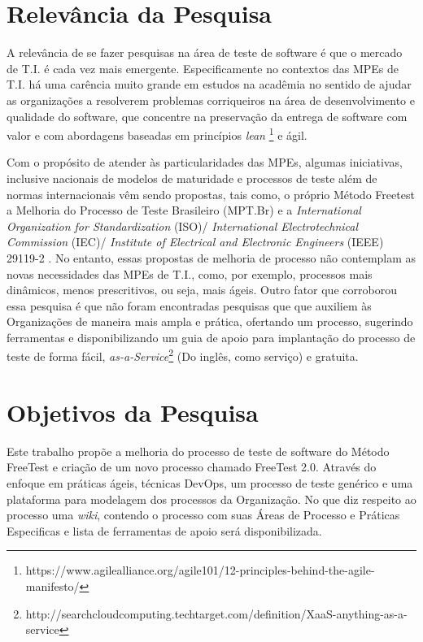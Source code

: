 \section{Relevância da Pesquisa}

A relevância de se fazer pesquisas na área de teste de software é que o mercado de T.I. é cada vez mais emergente. Especificamente no contextos das MPEs de T.I. há uma carência muito grande em estudos na acadêmia no sentido de ajudar as organizações a resolverem problemas corriqueiros na área de desenvolvimento e qualidade do software, que concentre na preservação da entrega de software com valor e com abordagens baseadas em princípios \textit{lean} \footnote{https://www.agilealliance.org/agile101/12-principles-behind-the-agile-manifesto/} e ágil.

Com o propósito de atender às particularidades das MPEs, algumas iniciativas, inclusive nacionais de modelos de maturidade e processos de teste além de normas internacionais vêm sendo propostas, tais como, o próprio Método Freetest \cite{Camilo-junior2012} a Melhoria do Processo de Teste Brasileiro (MPT.Br) \cite{GuiaMPTbr} e a \textit{International Organization for Standardization} (ISO)/ \textit{International Electrotechnical Commission} (IEC)/ \textit{Institute of Electrical and Electronic Engineers} (IEEE) 29119-2 \cite{Standard2013}. No entanto, essas propostas de melhoria de processo não contemplam as novas necessidades das MPEs de T.I., como, por exemplo, processos mais dinâmicos, menos prescritivos, ou seja, mais ágeis. Outro fator que corroborou essa pesquisa é que não foram encontradas pesquisas que que auxiliem às Organizações de maneira mais ampla e prática, ofertando um processo, sugerindo ferramentas e disponibilizando um guia de apoio para implantação do processo de teste de forma fácil, \textit{as-a-Service}\footnote{http://searchcloudcomputing.techtarget.com/definition/XaaS-anything-as-a-service} (Do inglês, como serviço) e gratuita.

\section{Objetivos da Pesquisa}
\label{cap:objetivos}

Este trabalho propõe a melhoria do processo de teste de software do Método FreeTest \cite{Camilo-junior2012} e criação de um novo processo chamado FreeTest 2.0. Através do enfoque em práticas ágeis, técnicas DevOps, um processo de teste genérico e uma plataforma para modelagem dos processos da Organização. No que diz respeito ao processo uma \textit{wiki}, contendo o processo com suas Áreas de Processo e Práticas Especificas e lista de ferramentas de apoio será disponibilizada. 

